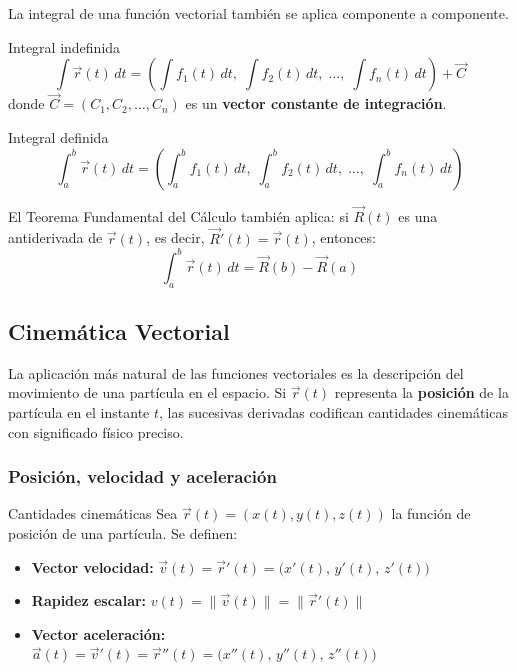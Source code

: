 La integral de una función vectorial también se aplica componente a componente.

\begin{mydefinition}{Integral indefinida}
\[ \int \vec{r}(t)\, dt = \left(\int f_1(t)\,dt,\; \int f_2(t)\,dt,\; \dots ,\; \int f_n(t)\,dt\right) + \vec{C} \]
donde $\vec{C} = (C_1, C_2, \dots , C_n)$ es un \textbf{vector constante de integración}.
\end{mydefinition}

\begin{mydefinition}{Integral definida}
\[ \int_a^b \vec{r}(t)\, dt = \left(\int_a^b f_1(t)\,dt,\; \int_a^b f_2(t)\,dt,\; \dots ,\; \int_a^b f_n(t)\,dt\right) \]
\end{mydefinition}

El Teorema Fundamental del Cálculo también aplica: si $\vec{R}(t)$ es una antiderivada de $\vec{r}(t)$, es decir, $\vec{R}'(t) = \vec{r}(t)$, entonces:
\[ \int_a^b \vec{r}(t)\, dt = \vec{R}(b) - \vec{R}(a) \]

\subsection{Cinemática Vectorial}

La aplicación más natural de las funciones vectoriales es la descripción del movimiento de una partícula en el espacio. Si $\vec{r}(t)$ representa la \textbf{posición} de la partícula en el instante $t$, las sucesivas derivadas codifican cantidades cinemáticas con significado físico preciso.

\subsubsection{Posición, velocidad y aceleración}

\begin{mydefinition}{Cantidades cinemáticas}
Sea $\vec{r}(t) = (x(t), y(t), z(t))$ la función de posición de una partícula. Se definen:
\begin{itemize}
    \item \textbf{Vector velocidad:} $\vec{v}(t) = \vec{r}'(t) = \bigl(x'(t),\, y'(t),\, z'(t)\bigr)$
    \item \textbf{Rapidez escalar:} $v(t) = \|\vec{v}(t)\| = \|\vec{r}'(t)\|$
    \item \textbf{Vector aceleración:} $\vec{a}(t) = \vec{v}'(t) = \vec{r}''(t) = \bigl(x''(t),\, y''(t),\, z''(t)\bigr)$
\end{itemize}
\end{mydefinition}

